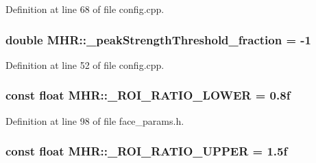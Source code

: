 Definition at line 68 of file config.\+cpp.

\hypertarget{namespace_m_h_r_a8a80b7897b02d4d2a57311a344df8497}{
\subsubsection[{\+\_\+peak\+Strength\+Threshold\+\_\+fraction}]{\setlength{\rightskip}{0pt plus 5cm}double M\+H\+R\+::\+\_\+peak\+Strength\+Threshold\+\_\+fraction = -\/1}}\label{namespace_m_h_r_a8a80b7897b02d4d2a57311a344df8497}


Definition at line 52 of file config.\+cpp.

\hypertarget{namespace_m_h_r_a8a54577ca92c7aa81cc87355a7160063}{
\subsubsection[{\+\_\+\+R\+O\+I\+\_\+\+R\+A\+T\+I\+O\+\_\+\+L\+O\+W\+E\+R}]{\setlength{\rightskip}{0pt plus 5cm}const float M\+H\+R\+::\+\_\+\+R\+O\+I\+\_\+\+R\+A\+T\+I\+O\+\_\+\+L\+O\+W\+E\+R = 0.\+8f}}\label{namespace_m_h_r_a8a54577ca92c7aa81cc87355a7160063}


Definition at line 98 of file face\+\_\+params.\+h.

\hypertarget{namespace_m_h_r_a4059754ac07ffb5b08e096059f347a82}{
\subsubsection[{\+\_\+\+R\+O\+I\+\_\+\+R\+A\+T\+I\+O\+\_\+\+U\+P\+P\+E\+R}]{\setlength{\rightskip}{0pt plus 5cm}const float M\+H\+R\+::\+\_\+\+R\+O\+I\+\_\+\+R\+A\+T\+I\+O\+\_\+\+U\+P\+P\+E\+R = 1.\+5f}}\label{namespace_m_h_r_a4059754ac07ffb5b08e096059f347a82}


